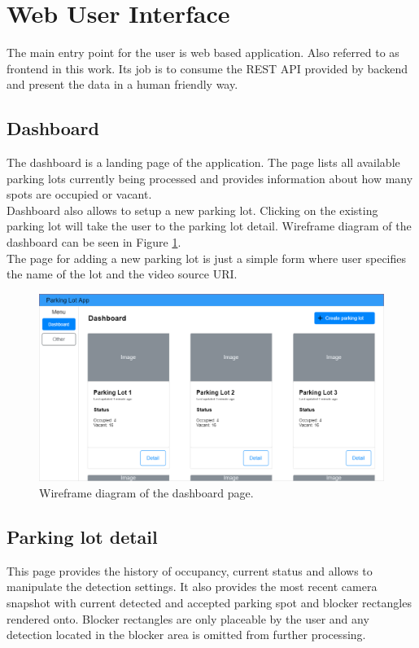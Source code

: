 \documentclass[thesis=M,english]{FITthesis}[2019/03/06]
\begin{document}
\section{Web User Interface}
The main entry point for the user is web based application. Also referred to as frontend in this work. Its job is to consume the REST API provided by backend and present the data in a human friendly way.

\subsection{Dashboard}
The dashboard is a landing page of the application. The page lists all available parking lots currently being processed and provides information about how many spots are occupied or vacant. \\

Dashboard also allows to setup a new parking lot. Clicking on the existing parking lot will take the user to the parking lot detail. Wireframe diagram of the dashboard can be seen in Figure \ref{label:dashboard_diagram}.\\

The page for adding a new parking lot is just a simple form where user specifies the name of the lot and the video source URI.

\begin{figure}[ht!]
	\centering
	\includegraphics[scale=0.5, angle=90]{imgs/dashboard-wireframe2.png}
	\caption{Wireframe diagram of the dashboard page.}
	\label{label:dashboard_diagram}
\end{figure}
\subsection{Parking lot detail}
This page provides the history of occupancy, current status and allows to manipulate the detection settings. It also provides the most recent camera snapshot with current detected and accepted parking spot and blocker rectangles rendered onto. Blocker rectangles are only placeable by the user and any detection located in the blocker area is omitted from further processing.\\
\end{document}
